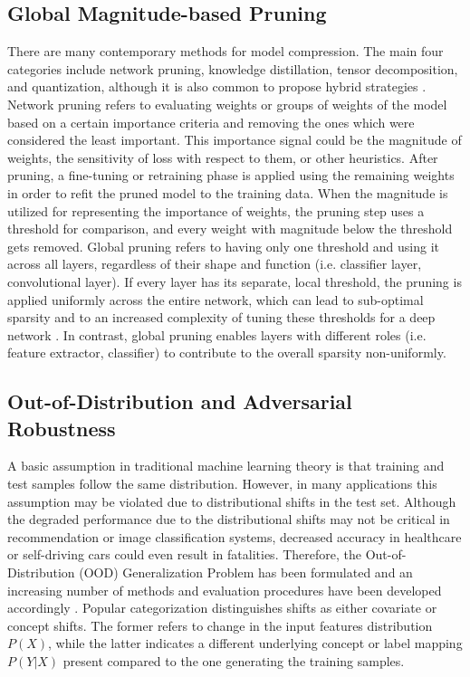 \subsection{Global Magnitude-based Pruning}\label{subsec:prune}

There are many contemporary methods for model compression. The main four categories include network pruning, knowledge distillation, tensor decomposition,
and quantization, although it is also common to propose hybrid strategies \cite{survey}. Network pruning refers to evaluating weights or groups of weights
of the model based on a certain importance criteria and removing the ones which were considered the least important. This importance signal could be
the magnitude of weights, the sensitivity of loss with respect to them, or other heuristics. After pruning, a fine-tuning or retraining phase is applied using the 
remaining weights in order to refit the pruned model to the training data.
When the magnitude is utilized for representing the importance of weights, the pruning step uses a threshold for comparison, and every weight with magnitude
below the threshold gets removed. Global pruning refers to having only one threshold and using it across all layers, regardless of their shape and function
(i.e. classifier layer, convolutional layer). If every layer has its separate, local threshold, the pruning is applied uniformly across the entire network,
which can lead to sub-optimal sparsity and to an increased complexity of tuning these thresholds for a deep network \cite{pruning_survey24}. In contrast, 
global pruning enables layers with different roles (i.e. feature extractor, classifier) to contribute to the overall sparsity non-uniformly.


\subsection{Out-of-Distribution and Adversarial Robustness}\label{subsec:ood&adv}

A basic assumption in traditional machine learning theory is that training and test samples follow the same distribution. However, in many applications this
assumption may be violated due to distributional shifts in the test set. Although the degraded performance due to the distributional shifts may not be critical
in recommendation or image classification systems, decreased accuracy in healthcare or self-driving cars could even result in fatalities.
Therefore, the Out-of-Distribution (OOD) Generalization Problem has
been formulated and an increasing number of methods and evaluation procedures have been developed accordingly \cite{oodgeneralization}. Popular categorization
distinguishes shifts as either covariate or concept shifts. The former refers to change in the input features distribution $ P(X) $, while the latter indicates
a different underlying concept or label mapping $P(Y | X)$ present compared to the one generating the training samples.

